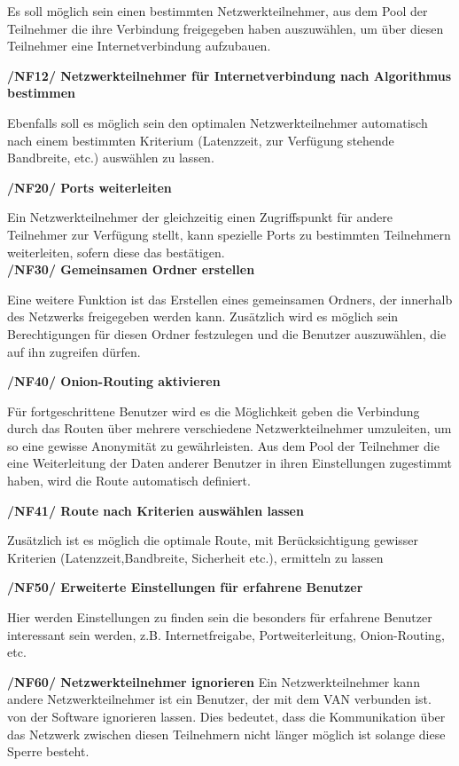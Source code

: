 \documentclass[a4paper,12pt]{scrreprt}
\begin{document}
	Es soll möglich sein einen bestimmten Netzwerkteilnehmer, aus dem Pool der Teilnehmer die ihre Verbindung freigegeben haben auszuwählen, um über diesen Teilnehmer eine Internetverbindung aufzubauen.
	
	\textbf {/NF12/ Netzwerkteilnehmer für Internetverbindung nach Algorithmus bestimmen}
	
	Ebenfalls soll es möglich sein den optimalen Netzwerkteilnehmer automatisch nach einem bestimmten Kriterium (Latenzzeit, zur Verfügung stehende Bandbreite, etc.) auswählen zu lassen.
	
	\textbf {/NF20/ Ports weiterleiten}
	
	Ein Netzwerkteilnehmer der gleichzeitig einen Zugriffspunkt für andere Teilnehmer zur Verfügung stellt, kann spezielle Ports zu bestimmten Teilnehmern weiterleiten, sofern diese das bestätigen.\\
	
	\textbf {/NF30/ Gemeinsamen Ordner erstellen}
	
	Eine weitere Funktion ist das Erstellen eines gemeinsamen Ordners, der innerhalb des Netzwerks freigegeben werden kann. Zusätzlich wird es möglich sein Berechtigungen für diesen Ordner festzulegen und die Benutzer auszuwählen, die auf ihn zugreifen dürfen.
	
	\textbf {/NF40/ Onion-Routing aktivieren}
	
	Für fortgeschrittene Benutzer wird es die Möglichkeit geben die Verbindung durch das Routen über mehrere verschiedene Netzwerkteilnehmer umzuleiten, um so eine gewisse Anonymität zu gewährleisten. Aus dem Pool der Teilnehmer die eine Weiterleitung der Daten anderer Benutzer in ihren Einstellungen zugestimmt haben, wird die Route automatisch definiert.
	
	\textbf {/NF41/ Route nach Kriterien auswählen lassen}
	
	Zusätzlich ist es möglich die optimale Route, mit Berücksichtigung gewisser Kriterien (Latenzzeit,Bandbreite, Sicherheit etc.), ermitteln zu lassen
	
	\textbf {/NF50/ Erweiterte Einstellungen für erfahrene Benutzer}
	
	Hier werden Einstellungen zu finden sein die besonders für erfahrene Benutzer interessant sein werden, z.B. Internetfreigabe, Portweiterleitung, Onion-Routing, etc.
	
	\textbf {/NF60/ Netzwerkteilnehmer ignorieren}	
	Ein Netzwerkteilnehmer kann andere Netzwerkteilnehmer ist ein Benutzer, der mit dem VAN verbunden ist. von der Software ignorieren lassen. Dies bedeutet, dass die Kommunikation über das Netzwerk zwischen diesen Teilnehmern nicht länger möglich ist solange diese Sperre besteht.
	
\end{document}
